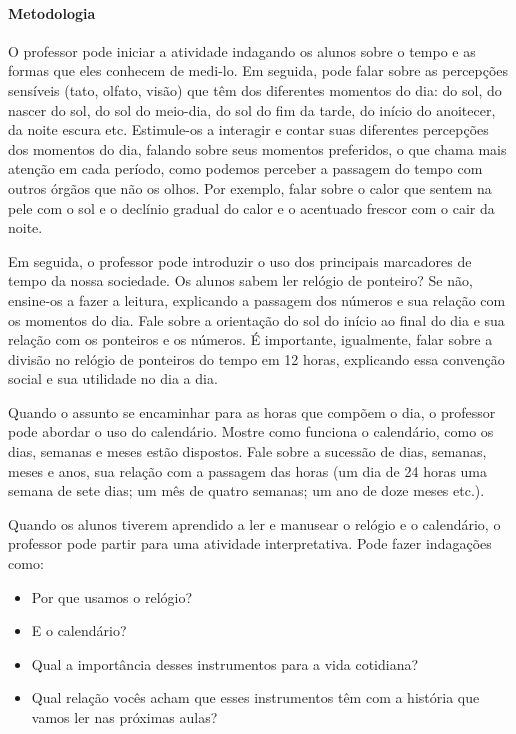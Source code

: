 \documentclass[11pt]{extarticle}
\begin{document}
\paragraph{Metodologia} O professor pode iniciar a atividade indagando os alunos sobre o tempo e as formas que eles conhecem de medi-lo. Em seguida, pode falar sobre as percepções sensíveis (tato, olfato, visão) que têm dos diferentes momentos do dia: do sol, do nascer do sol, do sol do meio-dia, do sol do fim da tarde, do início do anoitecer, da noite escura etc. Estimule-os a interagir e contar suas diferentes percepções dos momentos do dia, falando sobre seus momentos preferidos, o que chama mais atenção em cada período, como podemos perceber a passagem do tempo com outros órgãos que não os olhos. Por exemplo, falar sobre o calor que sentem na pele com o sol e o declínio gradual do calor e o acentuado frescor com o cair da noite.

Em seguida, o professor pode introduzir o uso dos principais marcadores de tempo da nossa sociedade. Os alunos sabem ler relógio de ponteiro? Se não, ensine-os a fazer a leitura, explicando a passagem dos números e sua relação com os momentos do dia. Fale sobre a orientação do sol do início ao final do dia e sua relação com os ponteiros e os números. É importante, igualmente, falar sobre a divisão no relógio de ponteiros do tempo em 12 horas, explicando essa convenção social e sua utilidade no dia a dia.

Quando o assunto se encaminhar para as horas que compõem o dia, o professor pode abordar o uso do calendário. Mostre como funciona o calendário, como os dias, semanas e meses estão dispostos. Fale sobre a sucessão de dias, semanas, meses e anos, sua relação com a passagem das horas (um dia de 24 horas uma semana de sete dias; um mês de quatro semanas; um ano de doze meses etc.).

Quando os alunos tiverem aprendido a ler e manusear o relógio e o calendário, o professor pode partir para uma atividade interpretativa. Pode fazer indagações como:

\begin{itemize}
\item Por que usamos o relógio?
\item E o calendário?
\item Qual a importância desses instrumentos para a vida cotidiana?
\item Qual relação vocês acham que esses instrumentos têm com a história que vamos ler nas próximas aulas?
\end{itemize}
\end{document}
